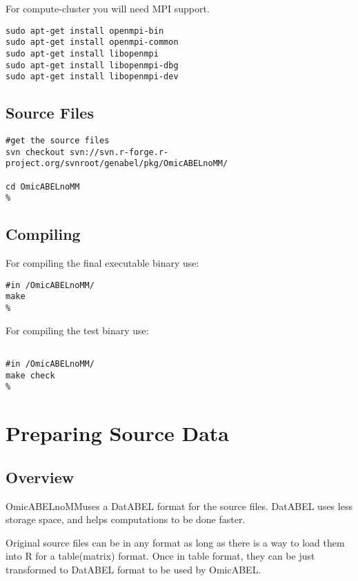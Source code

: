 \documentclass{report}
\newcommand{\oanomm}{OmicABELnoMM}
\begin{document}
For compute-cluster you will need \ac{MPI} support.

\begin{lstlisting}[escapechar=\%]
sudo apt-get install openmpi-bin
sudo apt-get install openmpi-common
sudo apt-get install libopenmpi
sudo apt-get install libopenmpi-dbg
sudo apt-get install libopenmpi-dev
\end{lstlisting}


\section{Source Files}

\begin{lstlisting}[escapechar=\%]
#get the source files
svn checkout svn://svn.r-forge.r-project.org/svnroot/genabel/pkg/OmicABELnoMM/

cd OmicABELnoMM
%
\end{lstlisting}

\section{Compiling}

For compiling the final executable binary use:
\begin{lstlisting}[escapechar=\%]
#in /OmicABELnoMM/
make
%
\end{lstlisting}

For compiling the test binary use:
\begin{lstlisting}[escapechar=\%]

#in /OmicABELnoMM/
make check
%
\end{lstlisting}

\chapter{Preparing Source Data}

\section{Overview}

\oanomm uses a DatABEL format for the source files. DatABEL uses less storage space, and helps computations to be done faster.

Original source files can be in any format as long as there is a way to load them into R for a table(matrix) format. Once in table format, they can be just transformed to DatABEL format to be used by OmicABEL.
\end{document}
